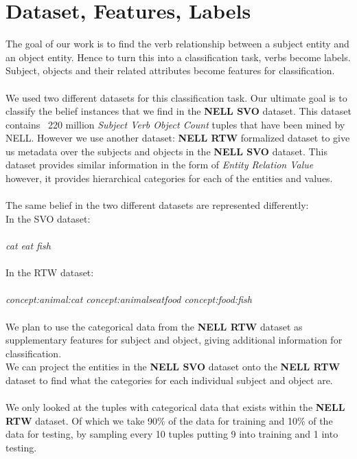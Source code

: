 \section{Dataset, Features, Labels}

The goal of our work is to find the verb relationship between a subject entity and an object entity. Hence to turn this into a classification task, verbs become labels. Subject, objects and their related attributes become features for classification.\\
\\
We used two different datasets for this classification task. Our ultimate goal is to classify the belief instances that we find in the \textbf{NELL SVO} dataset. This dataset contains ~220 million \emph{Subject Verb Object Count} tuples that have been mined by NELL. However we use another dataset: \textbf{NELL RTW} formalized dataset to give us metadata over the subjects and objects in the \textbf{NELL SVO} dataset. This dataset provides similar information in the form of \emph{Entity Relation Value} however, it provides hierarchical categories for each of the entities and values.\\
\\
The same belief in the two different datasets are represented differently:\\
In the SVO dataset:\\
\\
\emph{cat eat fish}\\
\\
In the RTW dataset:\\
\\
\emph{concept:animal:cat concept:animalseatfood concept:food:fish}\\
\\
We plan to use the categorical data from the \textbf{NELL RTW} dataset as supplementary features for subject and object, giving additional information for classification.\\ We can project the entities in the \textbf{NELL SVO} dataset onto the \textbf{NELL RTW} dataset to find what the categories for each individual subject and object are.\\
\\
We only looked at the tuples with categorical data that exists within the \textbf{NELL RTW} dataset. Of which we take 90\% of the data for training and 10\% of the data for testing, by sampling every 10 tuples putting 9 into training and 1 into testing. 